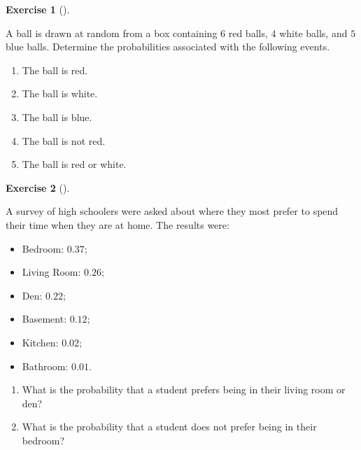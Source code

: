 \documentclass[
  letterpaper,
  DIV=11,
  numbers=noendperiod]{scrreprt}
\providecommand{\tightlist}{%
  \setlength{\itemsep}{0pt}\setlength{\parskip}{0pt}}\usepackage{longtable,booktabs,array}
\theoremstyle{definition}
\theoremstyle{definition}
\newtheorem{exercise}{Exercise}[chapter]
\theoremstyle{definition}
\theoremstyle{remark}
\begin{document}
\begin{exercise}[]\protect\hypertarget{exr-3.3}{}\label{exr-3.3}

A ball is drawn at random from a box containing \(6\) red balls, \(4\)
white balls, and \(5\) blue balls. Determine the probabilities
associated with the following events.

\begin{enumerate}
\def\labelenumi{\alph{enumi}.}
\tightlist
\item
  The ball is red.
\item
  The ball is white.
\item
  The ball is blue.
\item
  The ball is not red.
\item
  The ball is red or white.
\end{enumerate}

\end{exercise}

\begin{exercise}[]\protect\hypertarget{exr-3.4}{}\label{exr-3.4}

A survey of high schoolers were asked about where they most prefer to
spend their time when they are at home. The results were:

\begin{itemize}
\tightlist
\item
  Bedroom: \(0.37\);
\item
  Living Room: \(0.26\);
\item
  Den: \(0.22\);
\item
  Basement: \(0.12\);
\item
  Kitchen: \(0.02\);
\item
  Bathroom: \(0.01\).
\end{itemize}

\begin{enumerate}
\def\labelenumi{\alph{enumi}.}
\tightlist
\item
  What is the probability that a student prefers being in their living
  room or den?
\item
  What is the probability that a student does not prefer being in their
  bedroom?
\end{enumerate}

\end{exercise}
\end{document}
